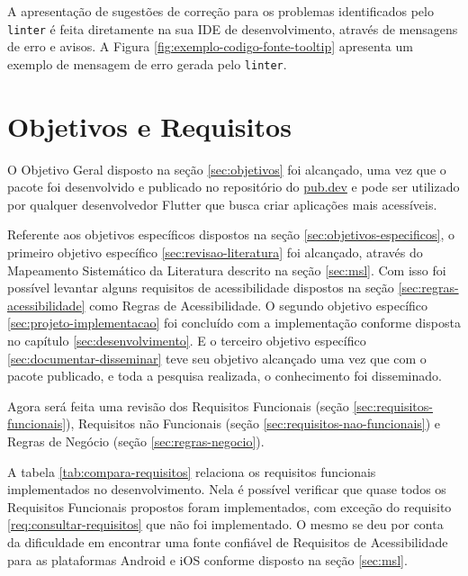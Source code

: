 A apresentação de sugestões de correção para os problemas identificados pelo \texttt{linter} é feita diretamente na sua IDE de desenvolvimento, através de mensagens de erro e avisos. A Figura \ref{fig:exemplo-codigo-fonte-tooltip} apresenta um exemplo de mensagem de erro gerada pelo \texttt{linter}.

\section{Objetivos e Requisitos}

O Objetivo Geral disposto na seção \ref{sec:objetivos} foi alcançado, uma vez que o pacote  foi desenvolvido e publicado no repositório do \href{https://pub.dev/packages/accessibility_lint}{pub.dev} e pode ser utilizado por qualquer desenvolvedor Flutter que busca criar aplicações mais acessíveis.

Referente aos objetivos específicos dispostos na seção \ref{sec:objetivos-especificos}, o primeiro objetivo específico \ref{sec:revisao-literatura} foi alcançado, através do Mapeamento Sistemático da Literatura descrito na seção \ref{sec:msl}. Com isso foi possível levantar alguns requisitos de acessibilidade dispostos na seção \ref{sec:regras-acessibilidade} como Regras de Acessibilidade. O segundo objetivo específico \ref{sec:projeto-implementacao} foi concluído com a implementação conforme disposta no capítulo \ref{sec:desenvolvimento}. E o terceiro objetivo específico \ref{sec:documentar-disseminar} teve seu objetivo alcançado uma vez que com o pacote publicado, e toda a pesquisa realizada, o conhecimento foi disseminado.

Agora será feita uma revisão dos Requisitos Funcionais (seção \ref{sec:requisitos-funcionais}), Requisitos não Funcionais (seção \ref{sec:requisitos-nao-funcionais}) e Regras de Negócio (seção \ref{sec:regras-negocio}).

A tabela \ref{tab:compara-requisitos} relaciona os requisitos funcionais implementados no desenvolvimento. Nela é possível verificar que quase todos os Requisitos Funcionais propostos foram implementados, com exceção do requisito \ref{req:consultar-requisitos} que não foi implementado. O mesmo se deu por conta da dificuldade em encontrar uma fonte confiável de Requisitos de Acessibilidade para as plataformas Android e iOS conforme disposto na seção \ref{sec:msl}.

